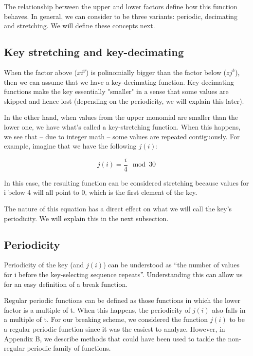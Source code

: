 \documentclass[pdftex,12pt,letter]{article}
\begin{document}
The relationship between the upper and lower factors define how this function behaves. 
In general, we can consider to be three variants: periodic, decimating and stretching. 
We will define these concepts next.

\subsection{Key stretching and key-decimating}

When the factor above ($xi^y$) is polinomially bigger than the factor below
($zj^k$), then we can assume that we have a key-decimating function. Key
decimating functions make the key essentially "smaller" in a sense that some
values are skipped and hence lost (depending on the periodicity, we will
explain this later).

In the other hand, when values from the upper monomial are smaller than the
lower one, we have what's called a key-stretching function. When this happens,
we see that -- due to integer math -- some values are repeated contiguously.
For example, imagine that we have the following $j(i)$:

\begin{equation}
    j(i) = \frac{i}{4}\mod{30}
\end{equation}

In this case, the resulting function can be considered stretching because
values for i below 4 will all point to 0, which is the first element of the
key.

The nature of this equation has a direct effect on what we will call the key's
periodicity. We will explain this in the next subsection.

\subsection{Periodicity}

Periodicity of the key (and $j(i)$) can be understood as ``the number of values for i
before the key-selecting sequence repeats''. Understanding this can allow us for 
an easy definition of a break function. 

Regular periodic functions can be defined as those functions in which the lower
factor is a multiple of t. When this happens, the periodicity of $j(i)$ also falls
in a multiple of t. For our breaking scheme, we considered the function $j(i)$ to  
be a regular periodic function since it was the easiest to analyze. However, in 
Appendix B, we describe methods that could have been used to tackle the non-regular
periodic family of functions.
\end{document}
